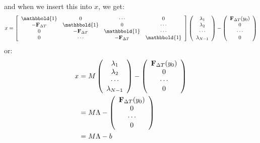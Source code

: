 \documentclass[11pt,a4paper]{article}
\begin{document}
and when we insert this into $x$, we get:
\begin{align}
x = \left[ \begin{array}{cccc}
   \mathbbold{1} & 0 & \cdots & 0 \\  
   -\bold{F}_{\Delta T} & \mathbbold{1} & 0 & \cdots \\ 
   0 &-\bold{F}_{\Delta T} & \mathbbold{1}  & \cdots \\
   0 &\cdots &-\bold{F}_{\Delta T} &  \mathbbold{1}  \\
   \end{array}  \right]
   \left( \begin{array}{c}
   \lambda_1 \\  
   \lambda_2 \\ 
   \cdots  \\
   \lambda_{N-1}  \\
   \end{array}  \right) -
   \left( \begin{array}{c}
   \bold{F}_{\Delta T}(y_0)\\  
   0\\ 
   \cdots  \\
   0  \\
   \end{array}  \right)
\end{align}
or:
\begin{align}
x  &= M \left( \begin{array}{c}
   \lambda_1 \\  
   \lambda_2 \\ 
   \cdots  \\
   \lambda_{N-1}  \\
   \end{array}  \right) -
   \left( \begin{array}{c}
   \bold{F}_{\Delta T}(y_0)\\  
   0\\ 
   \cdots  \\
   0  \\
   \end{array}  \right) \\
   & = M \Lambda -\left( \begin{array}{c}
   \bold{F}_{\Delta T}(y_0)\\  
   0\\ 
   \cdots  \\
   0  \\
   \end{array}  \right) \\
   &=M \Lambda-b
\end{align}
\end{document}
